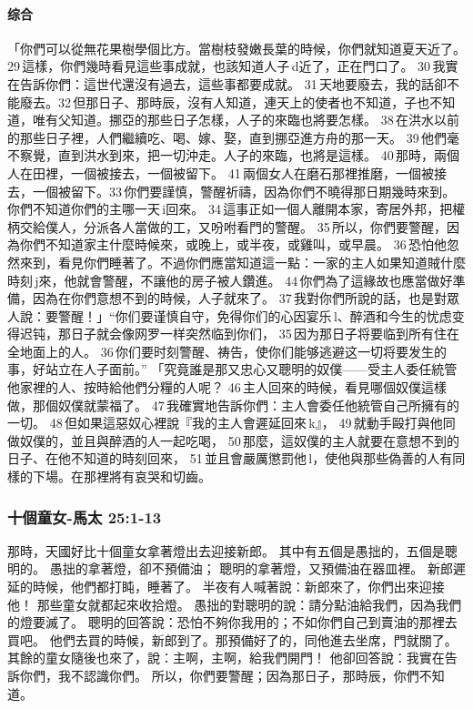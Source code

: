 \paragraph{综合}
「你們可以從無花果樹學個比方。當樹枝發嫩長葉的時候，你們就知道夏天近了。29 這樣，你們幾時看見這些事成就，也該知道人子 d近了，正在門口了。 30 我實在告訴你們：這世代還沒有過去，這些事都要成就。 31 天地要廢去，我的話卻不能廢去。32 但那日子、那時辰，沒有人知道，連天上的使者也不知道，子也不知道，唯有父知道。挪亞的那些日子怎樣，人子的來臨也將要怎樣。 38 在洪水以前的那些日子裡，人們繼續吃、喝、嫁、娶，直到挪亞進方舟的那一天。 39 他們毫不察覺，直到洪水到來，把一切沖走。人子的來臨，也將是這樣。 40 那時，兩個人在田裡，一個被接去，一個被留下。 41 兩個女人在磨石那裡推磨，一個被接去，一個被留下。33 你們要謹慎，警醒祈禱，因為你們不曉得那日期幾時來到。你們不知道你們的主哪一天 i回來。 34 這事正如一個人離開本家，寄居外邦，把權柄交給僕人，分派各人當做的工，又吩咐看門的警醒。 35 所以，你們要警醒，因為你們不知道家主什麼時候來，或晚上，或半夜，或雞叫，或早晨。 36 恐怕他忽然來到，看見你們睡著了。不過你們應當知道這一點：一家的主人如果知道賊什麼時刻 j來，他就會警醒，不讓他的房子被人鑽進。 44 你們為了這緣故也應當做好準備，因為在你們意想不到的時候，人子就來了。 37 我對你們所說的話，也是對眾人說：要警醒！」“你们要谨慎自守，免得你们的心因宴乐 l、醉酒和今生的忧虑变得迟钝，那日子就会像网罗一样突然临到你们， 35 因为那日子将要临到所有住在全地面上的人。 36 你们要时刻警醒、祷告，使你们能够逃避这一切将要发生的事，好站立在人子面前。”
「究竟誰是那又忠心又聰明的奴僕——受主人委任統管他家裡的人、按時給他們分糧的人呢？ 46 主人回來的時候，看見哪個奴僕這樣做，那個奴僕就蒙福了。 47 我確實地告訴你們：主人會委任他統管自己所擁有的一切。 48 但如果這惡奴心裡說『我的主人會遲延回來 k』， 49 就動手毆打與他同做奴僕的，並且與醉酒的人一起吃喝， 50 那麼，這奴僕的主人就要在意想不到的日子、在他不知道的時刻回來， 51 並且會嚴厲懲罰他 l，使他與那些偽善的人有同樣的下場。在那裡將有哀哭和切齒。


\subsubsection{十個童女-馬太 25:1-13}
那時，天國好比十個童女拿著燈出去迎接新郎。
其中有五個是愚拙的，五個是聰明的。
愚拙的拿著燈，卻不預備油；
聰明的拿著燈，又預備油在器皿裡。
新郎遲延的時候，他們都打盹，睡著了。
半夜有人喊著說：新郎來了，你們出來迎接他！
那些童女就都起來收拾燈。
愚拙的對聰明的說：請分點油給我們，因為我們的燈要滅了。
聰明的回答說：恐怕不夠你我用的；不如你們自己到賣油的那裡去買吧。
他們去買的時候，新郎到了。那預備好了的，同他進去坐席，門就關了。
其餘的童女隨後也來了，說：主啊，主啊，給我們開門！
他卻回答說：我實在告訴你們，我不認識你們。
所以，你們要警醒；因為那日子，那時辰，你們不知道。

